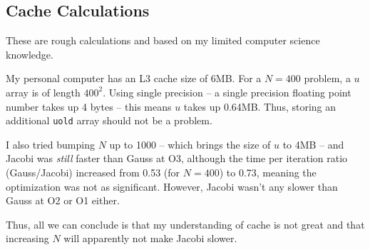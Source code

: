 \documentclass{SelimArticle}
\begin{document}
\subsection{Cache Calculations}
These are rough calculations and based on my limited computer science knowledge.

My personal computer has an L3 cache size of 6MB. For a $N = 400$ problem, a $u$ array is of length $400^2$.
Using single precision -- a single precision floating point number takes up 4 bytes -- this means $u$ takes up
0.64MB.  Thus, storing an additional \texttt{uold} array should not be a problem.

I also tried bumping $N$ up to 1000 -- which brings the size of $u$ to 4MB -- and Jacobi
was \textit{still} faster than Gauss at O3, although the time per iteration ratio (Gauss/Jacobi) increased
from 0.53 (for $N = 400$) to 0.73, meaning the optimization was not as significant. However, Jacobi wasn't any
slower than Gauss at O2 or O1 either.

Thus, all we can conclude is that my understanding of cache is not great and that increasing $N$ will
apparently not make Jacobi slower.
\end{document}
